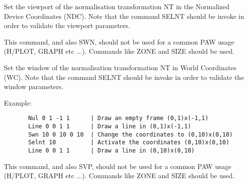 \BEGARG
{}
\ENDARG

   \par
Set the viewport of the normalisation transformation NT in the Normalized 
   Device Coordinates (NDC). Note that the command SELNT should be invoke in 
   order to validate the viewport parameters.  

   \par
This command, and also SWN, should not be used for a common PAW usage 
   (H/PLOT, GRAPH etc ...). Commands like ZONE and SIZE should be used.  

\ENDCMD


\BEGARG
{}
\ENDARG

   \par
Set the window of the normalisation transformation NT in World Coordinates 
   (WC). Note that the command SELNT should be invoke in order to validate the 
   window parameters.  

   \par
Example:  
\begin{verbatim}
       Nul 0 1 -1 1      | Draw an empty frame (0,1)x(-1,1)
       Line 0 0 1 1      | Draw a line in (0,1)x(-1,1)
       Swn 10 0 10 0 10  | Change the coordinates to (0,10)x(0,10)
       Selnt 10          | Activate the coordinates (0,10)x(0,10)
       Line 0 0 1 1      | Draw a line in (0,10)x(0,10)
\end{verbatim}
\ENDVERB
   \par
This command, and also SVP, should not be used for a common PAW usage 
   (H/PLOT, GRAPH etc ...). Commands like ZONE and SIZE should be used.  

\ENDCMD


\BEGARG
{}
\ENDARG

